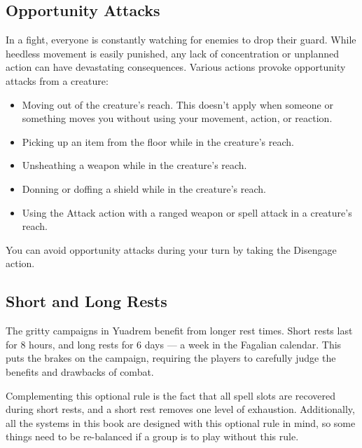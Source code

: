 \subsection*{Opportunity Attacks} \label{rule::opportunityattacks}
    In a fight, everyone is constantly watching for enemies to drop their guard.
    While heedless movement is easily punished, any lack of concentration or unplanned action can have devastating consequences.
    Various actions provoke opportunity attacks from a creature:
    \begin{itemize}
        \item Moving out of the creature's reach.
        This doesn't apply when someone or something moves you without using your movement, action, or reaction.

        \newpage

        \item Picking up an item from the floor while in the creature's reach.
        \item Unsheathing a weapon while in the creature's reach.
        \item Donning or doffing a shield while in the creature's reach.
        \item Using the Attack action with a ranged weapon or spell attack in a creature's reach.
    \end{itemize}
    You can avoid opportunity attacks during your turn by taking the Disengage action.

\subsection*{Short and Long Rests} \label{ssec::shortandlongrests}
    The gritty campaigns in Yuadrem benefit from longer rest times.
    Short rests last for 8 hours, and long rests for 6 days --- a week in the Fagalian calendar.
    This puts the brakes on the campaign, requiring the players to carefully judge the benefits and drawbacks of combat.

    Complementing this optional rule is the fact that all spell slots are recovered during short rests, and a short rest removes one level of exhaustion.
    Additionally, all the systems in this book are designed with this optional rule in mind, so some things need to be re-balanced if a group is to play without this rule.

